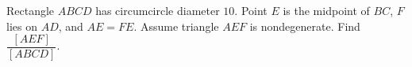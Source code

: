 Rectangle $ ABCD $ has circumcircle diameter $ 10 $. Point $ E $ is the midpoint of $ BC $, $ F $ lies on $ AD $, and $ AE=FE $. Assume triangle $ AEF $ is nondegenerate. Find $\dfrac{[AEF]}{[ABCD]}$.
